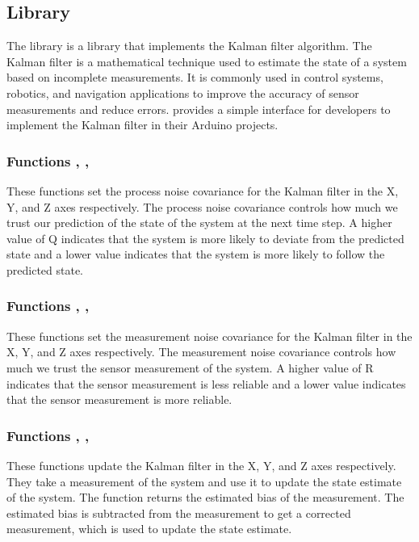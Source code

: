 \subsection{Library }

The library  is a library that implements the Kalman filter algorithm. The Kalman filter is a mathematical technique used to estimate the state of a system based on incomplete measurements. It is commonly used in control systems, robotics, and navigation applications to improve the accuracy of sensor measurements and reduce errors.  provides a simple interface for developers to implement the Kalman filter in their Arduino projects.\cite{arduino:2019Kalman,Fetick:2021}

\subsubsection{Functions , , }
These functions set the process noise covariance for the Kalman filter in the X, Y, and Z axes respectively. The process noise covariance controls how much we trust our prediction of the state of the system at the next time step. A higher value of Q indicates that the system is more likely to deviate from the predicted state and a lower value indicates that the system is more likely to follow the predicted state.

\subsubsection{Functions , , }
These functions set the measurement noise covariance for the Kalman filter in the X, Y, and Z axes respectively. The measurement noise covariance controls how much we trust the sensor measurement of the system. A higher value of R indicates that the sensor measurement is less reliable and a lower value indicates that the sensor measurement is more reliable.

\subsubsection{Functions , , }
These functions update the Kalman filter in the X, Y, and Z axes respectively. They take a measurement of the system and use it to update the state estimate of the system. The function returns the estimated bias of the measurement. The estimated bias is subtracted from the measurement to get a corrected measurement, which is used to update the state estimate.

